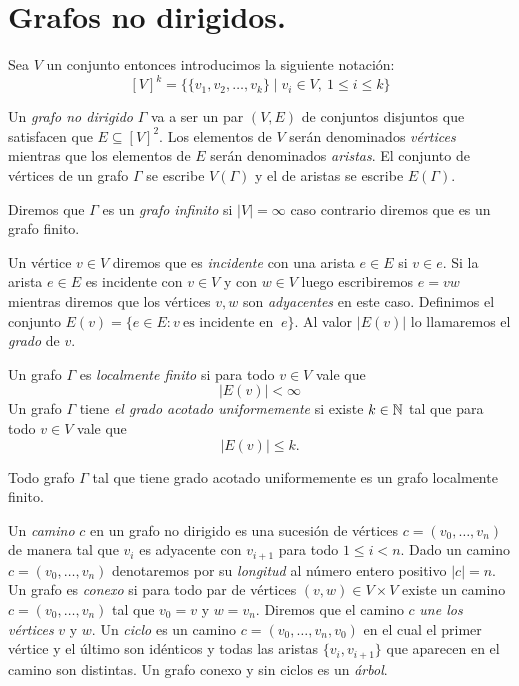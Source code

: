 \documentclass[tesis.tex]{subfiles}
\begin{document}
\section{Grafos no dirigidos.}\label{secc_graf_nd}

Sea $V$ un conjunto entonces introducimos la siguiente notación:
\[
	[V]^k = \{ \{ v_1, v_2, \dots, v_{k} \} \mid v_{i} \in V, \ 1 \le i \le k \}
\]

\begin{deff}
	Un \emph{grafo no dirigido} $\Gamma$ va a ser un par $(V,E)$ de conjuntos disjuntos que satisfacen que
	$E \subseteq [V]^2$.
	Los elementos de $V$ serán denominados \emph{vértices} mientras que los elementos de $E$ serán denominados \emph{aristas}.
	El conjunto de vértices de un grafo $\Gamma$ se escribe $V(\Gamma)$ y el de aristas se escribe $E(\Gamma)$.
\end{deff}


Diremos que $\Gamma$ es un \emph{grafo infinito} si $|V| = \infty$ caso contrario diremos que es un grafo finito.

Un vértice $v \in V$ diremos que es \emph{incidente} con una arista $e \in E$ si $v \in e$.
Si la arista $e \in E$ es incidente con $v \in V$ y con $w \in V$ luego escribiremos $e = vw$ mientras diremos que los vértices $v,w$ son \emph{adyacentes} en este caso.
Definimos el conjunto $E(v) = \{  e \in E : v \ \text{es incidente en } \ e \}$.
Al valor $|E(v)|$ lo llamaremos el \emph{grado} de $v$.


\begin{deff}
	Un grafo $\Gamma$ es \emph{localmente finito} si para todo $v \in V$ vale que
	\[
		| E(v) | < \infty
	\]
	Un grafo $\Gamma$ tiene \emph{el grado acotado uniformemente} si existe $k \in \mathbb{N}$ tal que para todo $v \in V$ vale que 
	\[
		|E(v)| \le k.
	\]
\end{deff}
\begin{obs}
	Todo grafo $\Gamma$ tal que tiene grado acotado uniformemente es un grafo localmente finito.
\end{obs}

Un \emph{camino} $c$ en un grafo no dirigido es una sucesión de vértices $c=(v_{0}, \dots, v_{n})$ de manera tal que $v_{i}$ es adyacente con $v_{i+1}$ para todo $1 \le i < n$.
Dado un camino $c = (v_{0}, \dots, v_{n})$ denotaremos por su \emph{longitud} al número entero positivo $|c|= n$.
Un grafo es \emph{conexo} si para todo par de vértices $(v,w) \in V \times V$ existe un camino $c = (v_{0}, \dots, v_{n})$ tal que $v_{0} = v$ y $w=v_{n}$.
Diremos que el camino $c$ \emph{une los vértices} $v$ y $w$.
Un \emph{ciclo} es un camino $c = (v_{0}, \dots, v_{n}, v_{0})$ en el cual el primer vértice y el último son idénticos y todas las aristas $\{ v_{i}, v_{i+1} \}$ que aparecen en el camino son distintas.
Un grafo conexo y sin ciclos es un \emph{árbol}.
\end{document}
